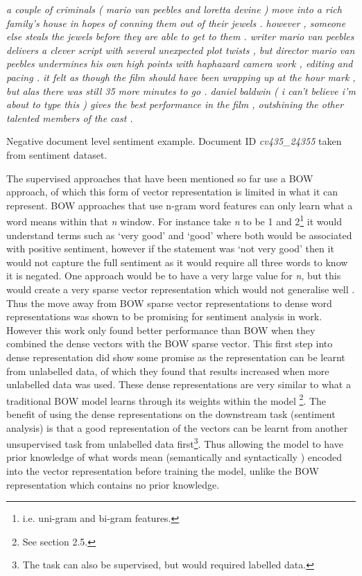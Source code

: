 \begin{example}
\textit{a couple of criminals ( mario van peebles and loretta devine ) move into a rich family's house in hopes of conning them out of their jewels . however , someone else steals the jewels before they are able to get to them . writer mario van peebles delivers a clever script with several unexpected plot twists , but director mario van peebles undermines his own high points with haphazard camera work , editing and pacing . it felt as though the film should have been wrapping up at the hour mark , but alas there was still 35 more minutes to go . daniel baldwin ( i can't believe i'm about to type this ) gives the best performance in the film , outshining the other talented members of the cast .}
\caption{Negative document level sentiment example. Document ID \textit{cv435\_24355} taken from \citet{pang-etal-2002-thumbs} sentiment dataset.}
\label{example:lit_review_document_sentiment}
\end{example}

The supervised approaches that have been mentioned so far use a BOW approach, of which this form of vector representation is limited in what it can represent. BOW approaches that use n-gram word features can only learn what a word means within that \textit{n} window. For instance take \textit{n} to be 1 and 2\footnote{i.e. uni-gram and bi-gram features.} it would understand terms such as `very good' and `good' where both would be associated with positive sentiment, however if the statement was `not very good' then it would not capture the full sentiment as it would require all three words to know it is negated. One approach would be to have a very large value for \textit{n}, but this would create a very sparse vector representation which would not generalise well \citep{le2014distributed}. Thus the move away from BOW sparse vector representations to dense word representations was shown to be promising for sentiment analysis in \citet{maas-etal-2011-learning} work. However this work only found better performance than BOW when they combined the dense vectors with the BOW sparse vector. This first step into dense representation did show some promise as the representation can be learnt from unlabelled data, of which they found that results increased when more unlabelled data was used. These dense representations are very similar to what a traditional BOW model learns through its weights within the model \citep{goldberg2017neural}\footnote{See section 2.5.}. The benefit of using the dense representations on the downstream task (sentiment analysis) is that a good representation of the vectors can be learnt from another unsupervised task from unlabelled data first\footnote{The task can also be supervised, but would required labelled data.}. Thus allowing the model to have prior knowledge of what words mean (semantically and syntactically \citep{mikolov2013efficient}) encoded into the vector representation before training the model, unlike the BOW representation which contains no prior knowledge. 

